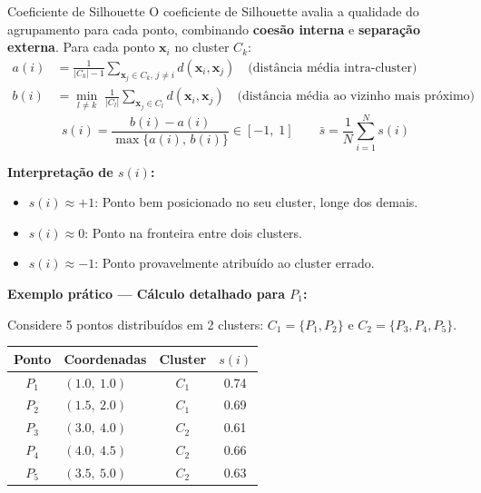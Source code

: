 \documentclass[12pt,a4paper]{article}
\begin{document}
\begin{definicaobox}{Coeficiente de Silhouette}
O coeficiente de Silhouette avalia a qualidade do agrupamento para cada ponto, combinando \textbf{coesão interna} e \textbf{separação externa}. Para cada ponto $\mathbf{x}_i$ no cluster $C_k$:
\begin{align*}
  a(i) &= \frac{1}{|C_k|-1}\sum_{\mathbf{x}_j \in C_k,\, j \neq i} d(\mathbf{x}_i, \mathbf{x}_j)
         \quad \text{(distância média intra-cluster)}\\
  b(i) &= \min_{l \neq k}\; \frac{1}{|C_l|}\sum_{\mathbf{x}_j \in C_l} d(\mathbf{x}_i, \mathbf{x}_j)
         \quad \text{(distância média ao vizinho mais próximo)}
\end{align*}
\[
  s(i) = \frac{b(i) - a(i)}{\max\{a(i),\, b(i)\}} \in [-1,\; 1]
  \qquad
  \bar{s} = \frac{1}{N}\sum_{i=1}^{N} s(i)
\]
\end{definicaobox}

\textbf{Interpretação de $s(i)$:}
\begin{itemize}
  \item $s(i) \approx +1$: Ponto bem posicionado no seu cluster, longe dos demais.
  \item $s(i) \approx 0$: Ponto na fronteira entre dois clusters.
  \item $s(i) \approx -1$: Ponto provavelmente atribuído ao cluster errado.
\end{itemize}

\textbf{Exemplo prático --- Cálculo detalhado para $P_1$:}

Considere 5 pontos distribuídos em 2 clusters: $C_1 = \{P_1, P_2\}$ e $C_2 = \{P_3, P_4, P_5\}$.

\begin{center}
\begin{tabular}{clcc}
\toprule
Ponto & Coordenadas & Cluster & $s(i)$ \\
\midrule
$P_1$ & $(1{.}0,\ 1{.}0)$ & $C_1$ & 0{.}74 \\
$P_2$ & $(1{.}5,\ 2{.}0)$ & $C_1$ & 0{.}69 \\
$P_3$ & $(3{.}0,\ 4{.}0)$ & $C_2$ & 0{.}61 \\
$P_4$ & $(4{.}0,\ 4{.}5)$ & $C_2$ & 0{.}66 \\
$P_5$ & $(3{.}5,\ 5{.}0)$ & $C_2$ & 0{.}63 \\
\bottomrule
\end{tabular}
\end{center}
\end{document}
